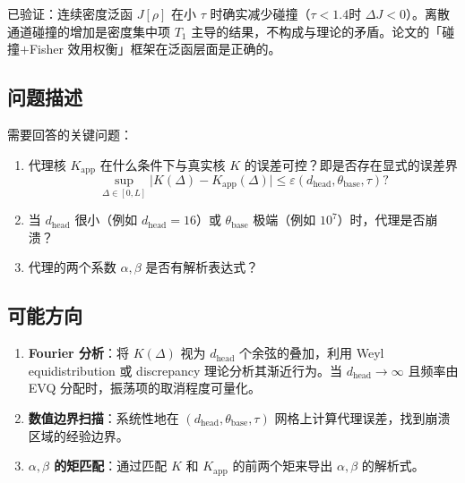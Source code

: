 \documentclass[11pt,a4paper]{article}
\newcommand{\zh}[1]{{\zhfont #1}}
\begin{document}
\zh{已验证：连续密度泛函} $J[\rho]$ \zh{在小} $\tau$ \zh{时确实减少碰撞（}$\tau < 1.4$\zh{时} $\Delta J < 0$\zh{）。离散通道碰撞的增加是密度集中项} $T_1$ \zh{主导的结果，不构成与理论的矛盾。论文的「碰撞}$+$\zh{Fisher 效用权衡」框架在泛函层面是正确的。}

\subsection*{\zh{问题描述}}
\zh{需要回答的关键问题：}
\begin{enumerate}[leftmargin=2em]
  \item \zh{代理核} $K_{\mathrm{app}}$ \zh{在什么条件下与真实核} $K$ \zh{的误差可控？即是否存在显式的误差界}
  \begin{equation}
    \sup_{\Delta \in [0, L]} \bigl|K(\Delta) - K_{\mathrm{app}}(\Delta)\bigr|
    \leq \varepsilon(d_{\mathrm{head}}, \theta_{\mathrm{base}}, \tau)?
  \end{equation}
  \item \zh{当} $d_{\mathrm{head}}$ \zh{很小（例如} $d_{\mathrm{head}}=16$\zh{）或} $\theta_{\mathrm{base}}$ \zh{极端（例如} $10^7$\zh{）时，代理是否崩溃？}
  \item \zh{代理的两个系数} $\alpha, \beta$ \zh{是否有解析表达式？}
\end{enumerate}

\subsection*{\zh{可能方向}}
\begin{enumerate}[leftmargin=2em]
  \item \textbf{Fourier \zh{分析}}\zh{：将} $K(\Delta)$ \zh{视为} $d_{\mathrm{head}}$ \zh{个余弦的叠加，利用} Weyl equidistribution \zh{或} discrepancy \zh{理论分析其渐近行为。当} $d_{\mathrm{head}} \to \infty$ \zh{且频率由} EVQ \zh{分配时，振荡项的取消程度可量化。}
  \item \textbf{\zh{数值边界扫描}}\zh{：系统性地在} $(d_{\mathrm{head}}, \theta_{\mathrm{base}}, \tau)$ \zh{网格上计算代理误差，找到崩溃区域的经验边界。}
  \item \textbf{$\alpha, \beta$ \zh{的矩匹配}}\zh{：通过匹配} $K$ \zh{和} $K_{\mathrm{app}}$ \zh{的前两个矩来导出} $\alpha, \beta$ \zh{的解析式。}
\end{enumerate}

\vspace{12pt}

\end{document}
